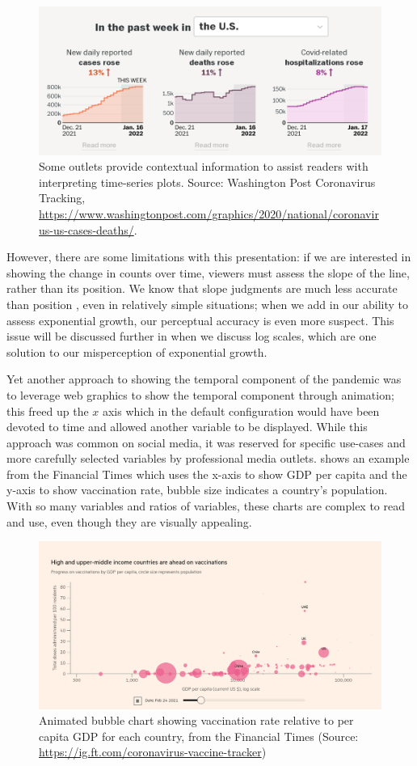 \documentclass[article]{jdssv}\usepackage[]{graphicx}\usepackage[]{xcolor}
\begin{document}
\begin{figure}
\centering
\includegraphics[width=.5\linewidth]{wapo-covid-context}
\caption{Some outlets provide contextual information to assist readers with interpreting time-series plots. Source: Washington Post Coronavirus Tracking, \url{https://www.washingtonpost.com/graphics/2020/national/coronavirus-us-cases-deaths/}.}
\label{fig:wapo-context}
\end{figure}

However, there are some limitations with this presentation: if we are interested in showing the change in counts over time, viewers must assess the slope of the line, rather than its position. We know that slope judgments are much less accurate than position \citep{clevelandGraphicalPerceptionVisual1987}, even in relatively simple situations; when we add in our ability to assess exponential growth, our perceptual accuracy is even more suspect. This issue will be discussed further in  when we discuss log scales, which are one solution to our misperception of exponential growth.

Yet another approach to showing the temporal component of the pandemic was to leverage web graphics to show the temporal component through animation; this freed up the $x$ axis which in the default configuration would have been devoted to time and allowed another variable to be displayed. While this approach was common on social media, it was reserved for specific use-cases and more carefully selected variables by professional media outlets.  shows an example from the Financial Times which uses the x-axis to show GDP per capita and the y-axis to show vaccination rate, bubble size indicates a country's population. With so many variables and ratios of variables, these charts are complex to read and use, even though they are visually appealing.

\begin{figure}
\centering
\includegraphics{ft_vaccine_bubble}
\caption{Animated bubble chart showing vaccination rate relative to per capita GDP for each country, from the Financial Times (Source: \url{https://ig.ft.com/coronavirus-vaccine-tracker})}\label{fig:bubble-ft}
\end{figure}
\end{document}
